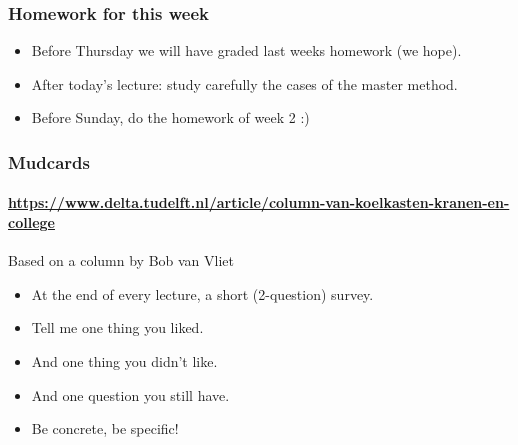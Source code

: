 
\begin{frame}
	\frametitle{Homework for this week}
	\begin{itemize}[<+->]
		\item \alert{Before} Thursday we will have graded last weeks homework (we hope).
		\item \alert{After} today's lecture: study carefully the cases of the master method.
		\item \alert{Before} Sunday, do the homework of week 2 :)
	\end{itemize}
\end{frame}

\begin{frame}
	\frametitle{Mudcards}
	\framesubtitle{\url{https://www.delta.tudelft.nl/article/column-van-koelkasten-kranen-en-college}}

	\begin{block}{Based on a column by Bob van Vliet}
		\begin{itemize}
			\item At the end of every lecture, a short (2-question) survey.
			\item Tell me one thing you liked.
			\item And one thing you didn't like.
			\item \alert{And one question you still have.}
			\item Be concrete, be specific!
		\end{itemize}
	\end{block}
\end{frame}

